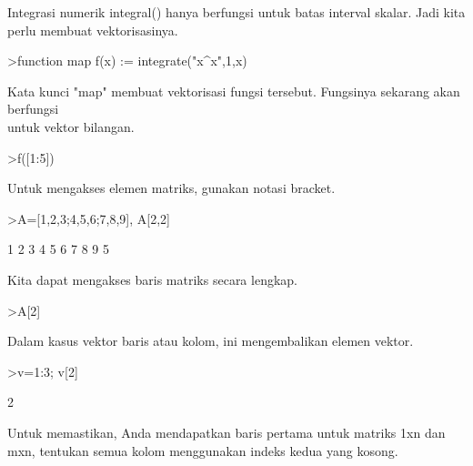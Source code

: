 \documentclass{article}
\begin{document}
\begin{eulernotebook}
\begin{eulercomment}
\begin{eulercomment}
\begin{eulercomment}
\begin{eulercomment}
\begin{eulercomment}
\begin{eulercomment}
\begin{eulercomment}
Integrasi numerik integral() hanya berfungsi untuk batas interval
skalar. Jadi kita perlu membuat vektorisasinya.
\end{eulercomment}
\begin{eulerprompt}
>function map f(x) := integrate("x^x",1,x)
\end{eulerprompt}
\begin{eulercomment}
Kata kunci "map" membuat vektorisasi fungsi tersebut. Fungsinya
sekarang akan berfungsi\\
untuk vektor bilangan.
\end{eulercomment}
\begin{eulerprompt}
>f([1:5])
\end{eulerprompt}
\begin{euleroutput}
  [0,  2.05045,  13.7251,  113.336,  1241.03]
\end{euleroutput}
\begin{eulercomment}
Untuk mengakses elemen matriks, gunakan notasi bracket.
\end{eulercomment}
\begin{eulerprompt}
>A=[1,2,3;4,5,6;7,8,9], A[2,2]
\end{eulerprompt}
\begin{euleroutput}
              1             2             3 
              4             5             6 
              7             8             9 
  5
\end{euleroutput}
\begin{eulercomment}
Kita dapat mengakses baris matriks secara lengkap.
\end{eulercomment}
\begin{eulerprompt}
>A[2]
\end{eulerprompt}
\begin{euleroutput}
  [4,  5,  6]
\end{euleroutput}
\begin{eulercomment}
Dalam kasus vektor baris atau kolom, ini mengembalikan elemen vektor.
\end{eulercomment}
\begin{eulerprompt}
>v=1:3; v[2]
\end{eulerprompt}
\begin{euleroutput}
  2
\end{euleroutput}
\begin{eulercomment}
Untuk memastikan, Anda mendapatkan baris pertama untuk matriks 1xn dan
mxn, tentukan semua kolom menggunakan indeks kedua yang kosong.
\end{eulercomment}

\end{eulercomment}
\end{eulercomment}
\end{eulercomment}
\end{eulercomment}
\end{eulercomment}
\end{eulercomment}
\end{eulernotebook}
\end{document}
